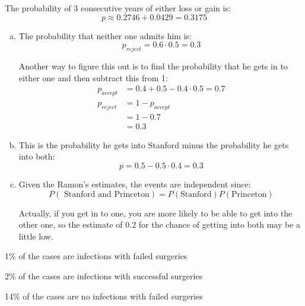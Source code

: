 \documentclass[letterpaper, landscape]{exam}
\begin{document}
\begin{description}
\begin{enumerate}[(a)]
            The probability of 3 consecutive years of either loss or gain is:
            \[
              p \approx 0.2746 + 0.0429 = \boxed{ 0.3175 }
            \]

        \end{enumerate}

      \item[31]
        \begin{enumerate}[(a)]
          \item The probability that neither one admits him is:
            \[
              p_{reject} = 0.6 \cdot 0.5 = \boxed{ 0.3 }
            \]

            Another way to figure this out is to find the probability that he
            gets in to either one and then subtract this from 1:
            \begin{align*}
              p_{accept} & = 0.4 + 0.5 - 0.4 \cdot 0.5 = 0.7 \\
              p_{reject} & = 1 - p_{accept} \\
                         & = 1 - 0.7 \\
                         & = 0.3
            \end{align*}

          \item
            This is the probability he gets into Stanford minus the probability
            he gets into both:
            \[
              p = 0.5 - 0.5 \cdot 0.4 = \boxed{ 0.3 }
            \]
            
          \item Given the Ramon's estimates, the events are independent since:
            \[
              P(\text{ Stanford and Princeton}) = P(\text{Stanford}) P(\text{Princeton})
            \]

            Actually, if you get in to one, you are more likely to be able to
            get into the other one, so the estimate of 0.2 for the chance of
            getting into both may be a little low.

        \end{enumerate}

      \item[32]
        \begin{enumerate*}
          \item 1\% of the cases are infections with failed surgeries
          \item 2\% of the cases are infections with successful surgeries
          \item 14\% of the cases are no infections with failed surgeries
        \end{enumerate*}


\end{description}
\end{document}
